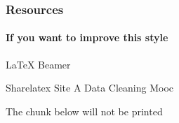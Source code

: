 \documentclass{article}\usepackage[]{graphicx}\usepackage[]{color}
\begin{document}
\begin{frame}
  \frametitle{Resources}
  \framesubtitle{If you want to improve this style}
  \begin{thebibliography}{10}

  \beamertemplatearticlebibitems
    LaTeX Beamer

  \bibitem{}
    Sharelatex Site %
  \bibitem{}
    A Data Cleaning Mooc %
  \end{thebibliography}
\end{frame}

%
%



%
%









The chunk below will not be printed








\end{document}
